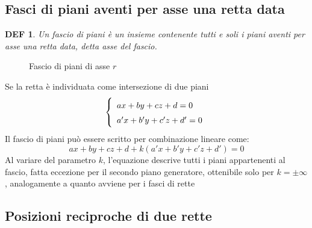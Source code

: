 \documentclass{article}     %
\newtheorem*{definition}{DEF}
\begin{document}
        \subsection{Fasci di piani aventi per asse una retta data}
        \begin{definition}
            Un fascio di piani è un insieme contenente tutti e soli i piani aventi per asse una retta data, detta asse del fascio. 
        \end{definition}
        \begin{wrapfigure}{r}{0.25\textwidth}
            \begin{center}
            \end{center}
            \caption{Fascio di piani di asse $r$}
        \end{wrapfigure}
        
            Se la retta è individuata come intersezione di due piani
            \[\left\{\renewcommand{\arraystretch}{1.5}\begin{array}{l}
                ax+by+cz+d=0\\
                a'x+b'y+c'z+d'=0
            \end{array}\right.\]
            Il fascio di piani può essere scritto per combinazione lineare come:
            \[ax+by+cz+d+k(a'x+b'y+c'z+d')=0\]
            Al variare del parametro $k$, l'equazione descrive tutti i piani appartenenti al fascio, fatta eccezione per il secondo piano generatore, ottenibile solo per $k=\pm\infty$, analogamente a quanto avviene per i fasci di rette
        \subsection{Posizioni reciproche di due rette}
\end{document}

